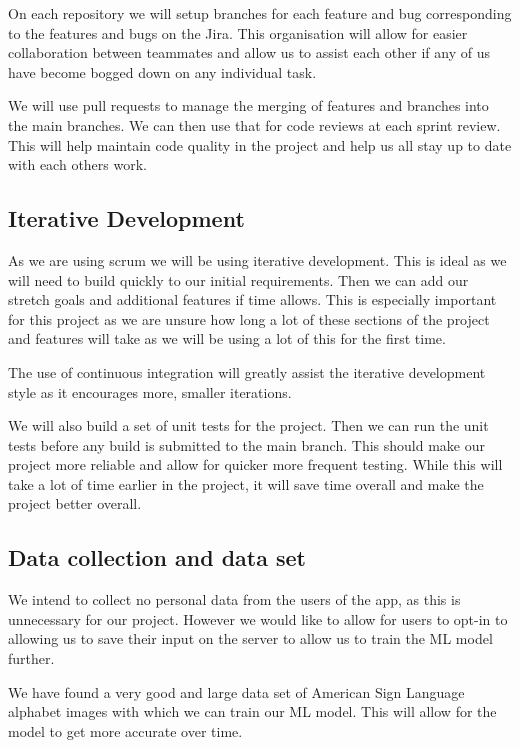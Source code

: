 \documentclass[10pt]{article}
\begin{document}
  On each repository we will setup branches for each feature and bug corresponding to the features 
  and bugs on the Jira. This organisation will allow for easier collaboration between teammates and 
  allow us to assist each other if any of us have become bogged down on any individual task.

  We will use pull requests to manage the merging of features and branches into the main branches. 
  We can then use that for code reviews at each sprint review. This will help maintain code quality 
  in the project and help us all stay up to date with each others work.

  \subsection{Iterative Development}

  As we are using scrum we will be using iterative development. This is ideal as we will need to 
  build quickly to our initial requirements. Then we can add our stretch goals and additional 
  features if time allows. This is especially important for this project as we are unsure how long a 
  lot of these sections of the project and features will take as we will be using a lot of this for 
  the first time. 

  The use of continuous integration will greatly assist the iterative development style as it 
  encourages more, smaller iterations.

  We will also build a set of unit tests for the project. Then we can run the unit tests before any 
  build is submitted to the main branch. This should make our project more reliable and allow for 
  quicker more frequent testing. While this will take a lot of time earlier in the project, it will 
  save time overall and make the project better overall.

  \subsection{Data collection and data set}

  We intend to collect no personal data from the users of the app, as this is unnecessary for our 
  project. However we would like to allow for users to opt-in to allowing us to save their input on 
  the server to allow us to train the ML model further. 

  We have found a very good and large data set of American Sign Language alphabet images with which 
  we can train our ML model. This will allow for the model to get more accurate over time.
\end{document}
